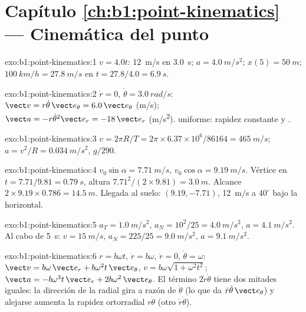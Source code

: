 \section*{Capítulo \ref{ch:b1:point-kinematics} --- Cinemática del punto}

\begin{solution}{exo:b1:point-kinematics:1}
$v = 4.0t$: \qty{12}{m/s} en \qty{3.0}{s}; $a = \qty{4.0}{m/s^2}$;
$x(5) = \qty{50}{m}$; $\qty{100}{km/h} = \qty{27.8}{m/s}$ en $t = 27.8/4.0
= \qty{6.9}{s}$.
\end{solution}

\begin{solution}{exo:b1:point-kinematics:2}
$\dot r = 0$, $\dot\theta = \qty{3.0}{rad/s}$: $\vect v = r\dot\theta\,\vect e_\theta
= 6.0\,\vect e_\theta$ (\unit{m/s}); $\vect a = -r\dot\theta^2\vect e_r =
-18\,\vect e_r$ (\unit{m/s^2}).  uniforme: rapidez
constante y .
\end{solution}

\begin{solution}{exo:b1:point-kinematics:3}
$v = 2\pi R/T = 2\pi \times 6.37\times10^6/86164 = \qty{465}{m/s}$;
$a = v^2/R = \qty{0.034}{m/s^2}$, $g/290$.
\end{solution}

\begin{solution}{exo:b1:point-kinematics:4}
$v_0\sin\alpha = \qty{7.71}{m/s}$, $v_0\cos\alpha = \qty{9.19}{m/s}$.
Vértice en $t = 7.71/9.81 = \qty{0.79}{s}$, altura $7.71^2/(2 \times 9.81) =
\qty{3.0}{m}$. Alcance $2 \times 9.19 \times 0.786 = \qty{14.5}{m}$.
Llegada al suelo: $(9.19, -7.71)$, \qty{12}{m/s} a $40^\circ$ bajo la
horizontal.
\end{solution}

\begin{solution}{exo:b1:point-kinematics:5}
$a_T = \qty{1.0}{m/s^2}$, $a_N = 10^2/25 = \qty{4.0}{m/s^2}$, $a =
\qty{4.1}{m/s^2}$. Al cabo de \qty{5}{s}: $v = \qty{15}{m/s}$, $a_N = 225/25 =
\qty{9.0}{m/s^2}$, $a = \qty{9.1}{m/s^2}$.
\end{solution}

\begin{solution}{exo:b1:point-kinematics:6}
$r = b\omega t$, $\dot r = b\omega$, $\ddot r = 0$, $\dot\theta = \omega$:
$\vect v = b\omega\,\vect e_r + b\omega^2 t\,\vect e_\theta$, $v = b\omega
\sqrt{1 + \omega^2t^2}$; $\vect a = -b\omega^3 t\,\vect e_r + 2b\omega^2\,
\vect e_\theta$. El término $2\dot r\dot\theta$ tiene dos mitades iguales:
la dirección de la  radial gira a razón de $\dot\theta$ (lo que
da $\dot r\dot\theta\,\vect e_\theta$) y alejarse aumenta la rapidez
ortorradial $r\dot\theta$ (otro $\dot r\dot\theta$).
\end{solution}

